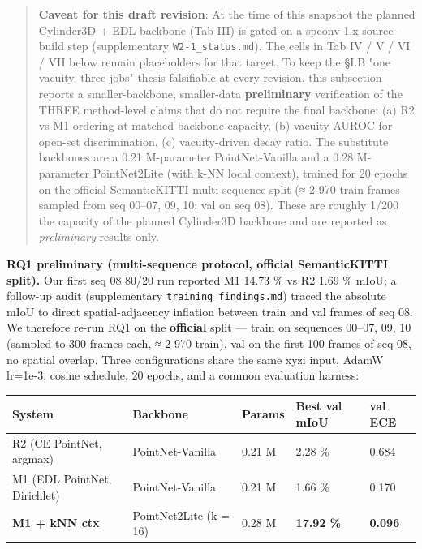 \documentclass[
]{article}
\newcounter{none} %
\begin{document}
\begin{quote}
\textbf{Caveat for this draft revision}: At the time of this snapshot
the planned Cylinder3D + EDL backbone (Tab III) is gated on a spconv 1.x
source-build step (supplementary \texttt{W2-1\_status.md}). The cells in
Tab IV / V / VI / VII below remain placeholders for that target. To keep
the §I.B "one vacuity, three jobs" thesis falsifiable at every revision,
this subsection reports a smaller-backbone, smaller-data
\textbf{preliminary} verification of the THREE method-level claims that
do not require the final backbone: (a) R2 vs M1 ordering at matched
backbone capacity, (b) vacuity AUROC for open-set discrimination, (c)
vacuity-driven decay ratio. The substitute backbones are a 0.21
M-parameter PointNet-Vanilla and a 0.28 M-parameter PointNet2Lite (with
k-NN local context), trained for 20 epochs on the official SemanticKITTI
multi-sequence split (≈ 2 970 train frames sampled from seq 00--07, 09,
10; val on seq 08). These are roughly 1/200 the capacity of the planned
Cylinder3D backbone and are reported as \emph{preliminary} results only.
\end{quote}

\textbf{RQ1 preliminary (multi-sequence protocol, official SemanticKITTI
split).} Our first seq 08 80/20 run reported M1 14.73 \% vs R2 1.69 \%
mIoU; a follow-up audit (supplementary \texttt{training\_findings.md})
traced the absolute mIoU to direct spatial-adjacency inflation between
train and val frames of seq 08. We therefore re-run RQ1 on the
\textbf{official} split --- train on sequences 00--07, 09, 10 (sampled
to 300 frames each, ≈ 2 970 train), val on the first 100 frames of seq
08, no spatial overlap. Three configurations share the same xyzi input,
AdamW lr=1e-3, cosine schedule, 20 epochs, and a common evaluation
harness:

{\def\LTcaptype{none} %
\begin{longtable}[]{@{}lllll@{}}
\toprule\noalign{}
System & Backbone & Params & Best val mIoU & val ECE \\
\midrule\noalign{}
\endhead
\bottomrule\noalign{}
\endlastfoot
R2 (CE PointNet, argmax) & PointNet-Vanilla & 0.21 M & 2.28 \% &
0.684 \\
M1 (EDL PointNet, Dirichlet) & PointNet-Vanilla & 0.21 M & 1.66 \% &
0.170 \\
\textbf{M1 + kNN ctx} & PointNet2Lite (k = 16) & 0.28 M & \textbf{17.92
\%} & \textbf{0.096} \\
\end{longtable}
}
\end{document}
